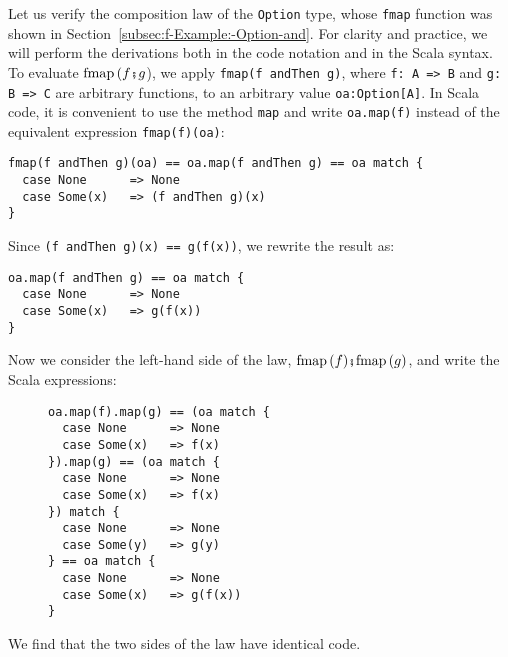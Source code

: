 Let us verify the composition law of the \lstinline!Option! type,
whose \lstinline!fmap! function was shown in Section~\ref{subsec:f-Example:-Option-and}.
For clarity and practice, we will perform the derivations both in
the code notation and in the Scala syntax. To evaluate $\text{fmap}\,(f\bef g$),
we apply \lstinline!fmap(f andThen g)!, where \lstinline!f: A => B!
and \lstinline!g: B => C! are arbitrary functions, to an arbitrary
value \lstinline!oa:Option[A]!. In Scala code, it is convenient to
use the  method \lstinline!map! and write \lstinline!oa.map(f)!
instead of the equivalent expression \lstinline!fmap(f)(oa)!:
\begin{lstlisting}
fmap(f andThen g)(oa) == oa.map(f andThen g) == oa match {
  case None      => None
  case Some(x)   => (f andThen g)(x)
}
\end{lstlisting}
Since \lstinline!(f andThen g)(x) == g(f(x))!, we rewrite the result
as:
\begin{lstlisting}
oa.map(f andThen g) == oa match {
  case None      => None
  case Some(x)   => g(f(x))
}
\end{lstlisting}

Now we consider the left-hand side of the law, $\text{fmap}\,(f)\bef\text{fmap}\,(g)$,
and write the Scala expressions:

\begin{wrapfigure}{l}{0.33\columnwidth}%
\vspace{-0.8\baselineskip}
\begin{lstlisting}
oa.map(f).map(g) == (oa match {
  case None      => None
  case Some(x)   => f(x)
}).map(g) == (oa match {
  case None      => None
  case Some(x)   => f(x)
}) match {
  case None      => None
  case Some(y)   => g(y)
} == oa match {
  case None      => None
  case Some(x)   => g(f(x))
}
\end{lstlisting}
\vspace{-5\baselineskip}
\end{wrapfigure}%

\noindent We find that the two sides of the law have identical code.

